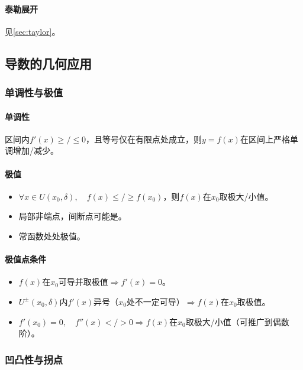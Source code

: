 \documentclass[
12pt, %
a4paper, 
oneside, %
]{scrartcl}
\begin{document}
\paragraph{泰勒展开}
见\ref{sec:taylor}。
\subsection[导数的几何应用]{导数的几何应用}
\subsubsection[单调性与极值]{单调性与极值}
\paragraph{单调性}
区间内$ f'(x) \geq/\leq 0 $，且等号仅在有限点处成立，则$ y = f(x) $在区间上严格单调增加/减少。
\paragraph{极值}
\begin{itemize}
\item $ \forall x \in U(x_0, \delta), \quad f(x) \leq/\geq f(x_0) $，则$ f(x) $在$ x_0 $取极大/小值。
\item 局部非端点，间断点可能是。
\item 常函数处处极值。
\end{itemize}
\paragraph{极值点条件}
\begin{itemize}
\item $ f(x) $在$ x_0 $可导并取极值$ \Rightarrow $$ f'(x) = 0 $。
\item $ U^\pm (x_0, \delta) $内$ f'(x) $异号（$ x_0 $处不一定可导）$ \Rightarrow $$ f(x) $在$ x_0 $取极值。
\item $ f'(x_0) = 0, \quad f''(x) </> 0 $$ \Rightarrow $$ f(x) $在$ x_0 $取极大/小值（可推广到偶数阶）。
\end{itemize}
\subsubsection[凹凸性与拐点]{凹凸性与拐点}
\end{document}
